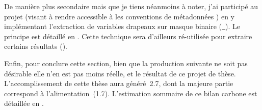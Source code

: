 De manière plus secondaire mais que je tiens néanmoins à noter, j'ai participé au projet  (visant à rendre accessible à  les conventions de métadonnées ) en y implémentant l'extraction de variables drapeaux sur masque binaire (\href{https://github.com/xarray-contrib/cf-xarray/pull/354}{~}).
Le principe est détaillé en .
Cette technique sera d'ailleurs ré-utilisée pour extraire certains résultats ().

\bigskip

Enfin, pour conclure cette section, bien que la production suivante ne soit pas désirable elle n'en est pas moins réelle, et le résultat de ce projet de thèse.
L'accomplissement de cette thèse aura généré~\qty{2.7}{\tcarbone}, dont la majeure partie correspond à l'alimentation~(\qty{1.7}{\tcarbone}).
L'estimation sommaire de ce bilan carbone est détaillée en .
